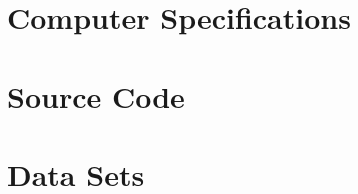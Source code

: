 \chapter{Computer Specifications}
\label{computerSpecifications}


\chapter{Source Code}
\label{sourceCode}


\chapter{Data Sets}
\label{dataSets}
